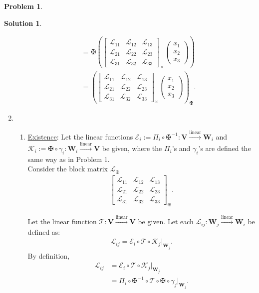 \documentclass{book}
\theoremstyle{definition}
\newtheorem*{prob*}{Problem}
\newtheorem*{sln*}{Solution}
\newcommand{\V}{\mathbf{V}}
\newcommand{\W}{\mathbf{W}}
\newcommand{\lag}{\mathcal{L}}
\newcommand{\K}{\mathcal{K}}
\newcommand{\E}{\mathcal{E}}
\newcommand{\lin}{\overset{\text{linear}}{\longrightarrow}}
\newcommand{\T}{\mathcal{T}}
\begin{document}
\begin{prob*}
\begin{sln*}
\begin{enumerate}
\begin{align*}
			&=
			\maltese\left(\begin{bmatrix}
			\lag_{11} & \lag_{12} & \lag_{13}\\
			\lag_{21} & \lag_{22} & \lag_{23}\\
			\lag_{31} & \lag_{32} & \lag_{33}
			\end{bmatrix}_\times \begin{pmatrix}
			x_1\\x_2\\x_3
			\end{pmatrix}\right)\\
			&= 
			\left( \begin{bmatrix}
			\lag_{11} & \lag_{12} & \lag_{13}\\
			\lag_{21} & \lag_{22} & \lag_{23}\\
			\lag_{31} & \lag_{32} & \lag_{33}
			\end{bmatrix}_\times \begin{pmatrix}
			x_1\\x_2\\x_3
			\end{pmatrix}   \right)_{\maltese}.
			\end{align*}
						
						
			
			\item 
			\begin{enumerate}
				\item \underline{Existence}: Let the linear functions $\E_i := \Pi_i \circ \maltese^{-1} : \V \lin \W_i$ and $\K_i := \maltese\circ \gamma_i : \W_i \lin \V$ be given, where the $\Pi_i$'s and $\gamma_i$'s are defined the same way as in Problem 1. \\
				
				Consider the block matrix $\lag_\oplus$
				\begin{align*}
				\begin{bmatrix}
				\lag_{11} & \lag_{12} & \lag_{13}\\
				\lag_{21} & \lag_{22} & \lag_{23}\\
				\lag_{31} & \lag_{32} & \lag_{33}
				\end{bmatrix}_\oplus.
				\end{align*}
				
				Let the linear function $\T : \V \lin \V$ be given. Let each $\lag_{ij} : \W_j \lin \W_i$ be defined as:
				\begin{align*}
				\lag_{ij} = \E_i \circ \T \circ \K_j \bigg\vert_{\W_j}.
				\end{align*}
				By definition,
				\begin{align*}
				\lag_{ij} &= \E_i \circ \T \circ \K_j \bigg\vert_{\W_j}\\
				&= \Pi_i \circ \maltese^{-1} \circ \T \circ \maltese\circ \gamma_j\bigg\vert_{\W_j}.
				\end{align*}
				

\end{enumerate}
\end{enumerate}
\end{sln*}
\end{prob*}
\end{document}
